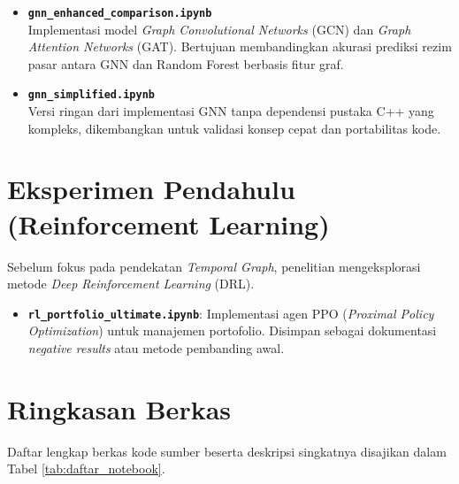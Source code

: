 \documentclass[a4paper,12pt]{article}
\begin{document}
\begin{itemize}
    \item \textbf{\texttt{gnn\_enhanced\_comparison.ipynb}} \\
    Implementasi model \textit{Graph Convolutional Networks} (GCN) dan \textit{Graph Attention Networks} (GAT). Bertujuan membandingkan akurasi prediksi rezim pasar antara GNN dan Random Forest berbasis fitur graf.
    
    \item \textbf{\texttt{gnn\_simplified.ipynb}} \\
    Versi ringan dari implementasi GNN tanpa dependensi pustaka C++ yang kompleks, dikembangkan untuk validasi konsep cepat dan portabilitas kode.
\end{itemize}

\section{Eksperimen Pendahulu (Reinforcement Learning)}
Sebelum fokus pada pendekatan \textit{Temporal Graph}, penelitian mengeksplorasi metode \textit{Deep Reinforcement Learning} (DRL).

\begin{itemize}
    \item \textbf{\texttt{rl\_portfolio\_ultimate.ipynb}}: Implementasi agen PPO (\textit{Proximal Policy Optimization}) untuk manajemen portofolio. Disimpan sebagai dokumentasi \textit{negative results} atau metode pembanding awal.
\end{itemize}

\section{Ringkasan Berkas}
Daftar lengkap berkas kode sumber beserta deskripsi singkatnya disajikan dalam Tabel \ref{tab:daftar_notebook}.
\end{document}
